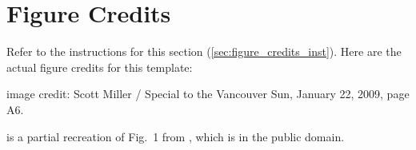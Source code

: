 \documentclass{vgtc}                          %
\begin{document}
\section*{Figure Credits}
\label{sec:figure_credits}

Refer to the instructions for this section (\cref{sec:figure_credits_inst}).
Here are the actual figure credits for this template:

 image credit: Scott Miller / Special to the Vancouver Sun, January 22, 2009, page A6.

 is a partial recreation of Fig.\ 1 from \cite{Isenberg:2017:VMC}, which is in the public domain.


%

%
%
%


\end{document}
